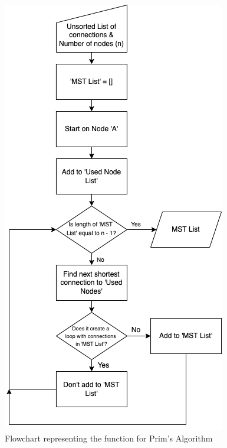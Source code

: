 \documentclass[twocolumn]{article}
\begin{document}
\begin{figure}[H]
\centering
\includegraphics[width=0.65\columnwidth]{Figures/Flowchart 4.png}
\caption{Flowchart representing the function for Prim’s Algorithm}
\label{fig:flow4}
\end{figure}
\end{document}
